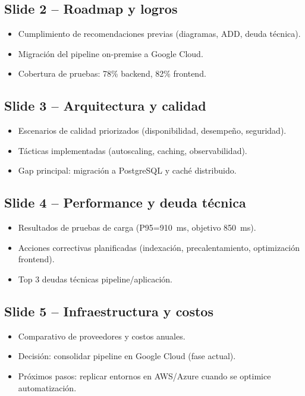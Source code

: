 \documentclass[12pt,letterpaper]{article}
\begin{document}
\subsection*{Slide 2 -- Roadmap y logros}
\begin{itemize}[leftmargin=1.2cm]
  \item Cumplimiento de recomendaciones previas (diagramas, ADD, deuda técnica).
  \item Migración del pipeline on-premise a Google Cloud.
  \item Cobertura de pruebas: 78\% backend, 82\% frontend.
\end{itemize}

\subsection*{Slide 3 -- Arquitectura y calidad}
\begin{itemize}[leftmargin=1.2cm]
  \item Escenarios de calidad priorizados (disponibilidad, desempeño, seguridad).
  \item Tácticas implementadas (autoscaling, caching, observabilidad).
  \item Gap principal: migración a PostgreSQL y caché distribuido.
\end{itemize}

\subsection*{Slide 4 -- Performance y deuda técnica}
\begin{itemize}[leftmargin=1.2cm]
  \item Resultados de pruebas de carga (P95=910~ms, objetivo 850~ms).
  \item Acciones correctivas planificadas (indexación, precalentamiento, optimización frontend).
  \item Top 3 deudas técnicas pipeline/aplicación.
\end{itemize}

\subsection*{Slide 5 -- Infraestructura y costos}
\begin{itemize}[leftmargin=1.2cm]
  \item Comparativo de proveedores y costos anuales.
  \item Decisión: consolidar pipeline en Google Cloud (fase actual).
  \item Próximos pasos: replicar entornos en AWS/Azure cuando se optimice automatización.
\end{itemize}
\end{document}
